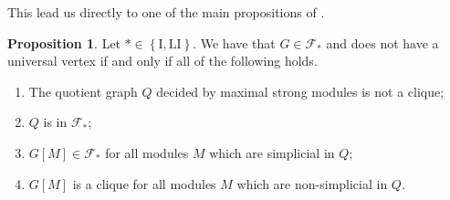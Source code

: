 \documentclass{article}
\theoremstyle{definition}
\newtheorem{prop}[thm]{Proposition}
\begin{document}
    This lead us directly to
    one of the main propositions 
    of \cite{main}.
    
    \begin{prop} \label{main prop}
        Let $* \in \left\{\text{I}, \text{LI}\right\}$. We have that
        $G \in \mathcal{F}_{*}$ and does not have a universal vertex
        if and only if all of the following holds.
        \begin{enumerate}
            \item The quotient graph $Q$ decided by maximal strong modules
                is not a clique; \label{1}
            \item $Q$ is in $\mathcal{F}_{*}$; \label{2}
            \item $G[M] \in \mathcal{F}_{*}$ for all modules $M$ which are simplicial in $Q$; \label{3}
            \item $G[M]$ is a clique for all modules $M$ which are non-simplicial in $Q$. \label{4}
        \end{enumerate}
    \end{prop}
\end{document}
